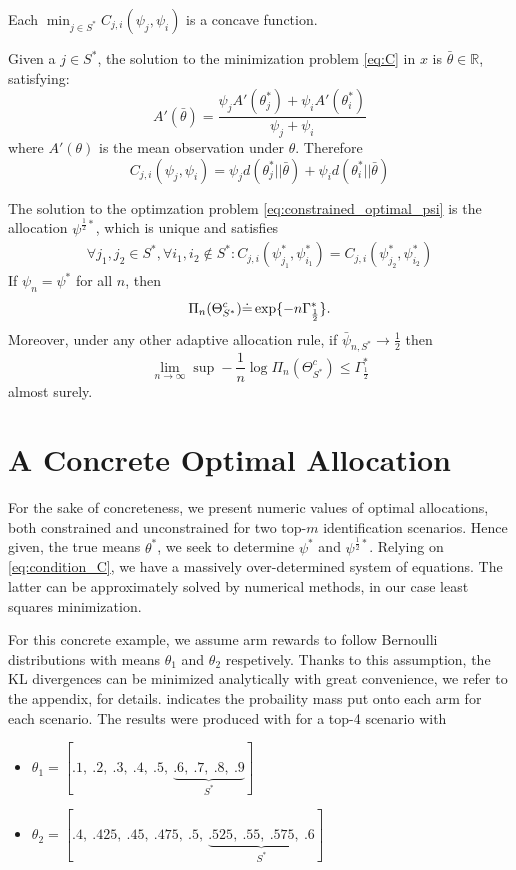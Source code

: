 \begin{lemma}\label{lemma:C_concave}
  Each $\min_{j \in S^*} C_{j, i}(\psi_j, \psi_i)$ is a concave function.
\end{lemma}

\begin{lemma}\label{lemma:C_unique_solution}
  Given a $j \in S^*$, the solution to the minimization problem \eqref{eq:C} in $x$ is $\bar{\theta} \in \mathbb{R}$, satisfying:
  \[A'(\bar{\theta}) = \frac{\psi_j A'(\theta_j^*) + \psi_i A'(\theta_i^*)}{\psi_j + \psi_i}\]
  where $A'(\theta)$ is the mean observation under $\theta$. Therefore
  \[C_{j, i}(\psi_j, \psi_i) = \psi_j d(\theta^*_j || \bar{\theta}) + \psi_i d(\theta^*_i || \bar{\theta})\]
\end{lemma}

\begin{proposition}\label{proposition:characterization}
  The solution to the optimzation problem \ref{eq:constrained_optimal_psi} is the allocation $\psi^{\frac{1}{2}*}$, which is unique and satisfies
  \begin{align}
    \forall j_1, j_2 \in S^*, \forall i_1, i_2 \notin S^*: C_{j, i}(\psi^*_{j_1}, \psi^*_{i_1}) = C_{j, i}(\psi^*_{j_2}, \psi^*_{i_2})\label{eq:condition_C}
  \end{align}
  If $\psi_n = \psi^*$ for all $n$, then
  \[\Pi_n(\Theta_{S^*}^c) \dot{=} \exp \{-n\Gamma^*_{\frac{1}{2}}\}.\]
  Moreover, under any other adaptive allocation rule, if $\bar{\psi}_{n, S^*} \rightarrow \frac{1}{2}$ then
  \[\lim_{n \rightarrow \infty} \sup - \frac{1}{n} \log \Pi_n(\Theta^c_{S^*}) \leq \Gamma^*_{\frac{1}{2}}\]
  almost surely.
\end{proposition}

\section{A Concrete Optimal Allocation}\label{section:conrete_optimal_allocation}
For the sake of concreteness, we present numeric values of optimal allocations, both constrained and unconstrained for two top-$m$ identification scenarios.
Hence given, the true means $\theta^*$, we seek to determine $\psi^*$ and $\psi^{\frac{1}{2}*}$. Relying on \eqref{eq:condition_C}, we have a massively over-determined system of equations. The latter can be approximately solved by numerical methods, in our case least squares minimization.

For this concrete example, we assume arm rewards to follow Bernoulli distributions with means $\theta_1$ and $\theta_2$ respetively. Thanks to this assumption, the KL divergences can be minimized analytically with great convenience, we refer to the appendix,  for details.  indicates the probaility mass put onto each arm for each scenario. The results were produced with for a top-4 scenario with
\begin{itemize}
  \item $\theta_1 = [.1,\ .2,\ .3,\ .4,\ .5,\ \underbrace{.6,\ .7,\ .8,\ .9}_\text{$S^*$}]$
  \item $\theta_2 = [.4,\ .425,\ .45,\ .475,\ .5,\ \underbrace{.525,\ .55,\ .575,\ .6}_\text{$S^*$}]$
\end{itemize}


